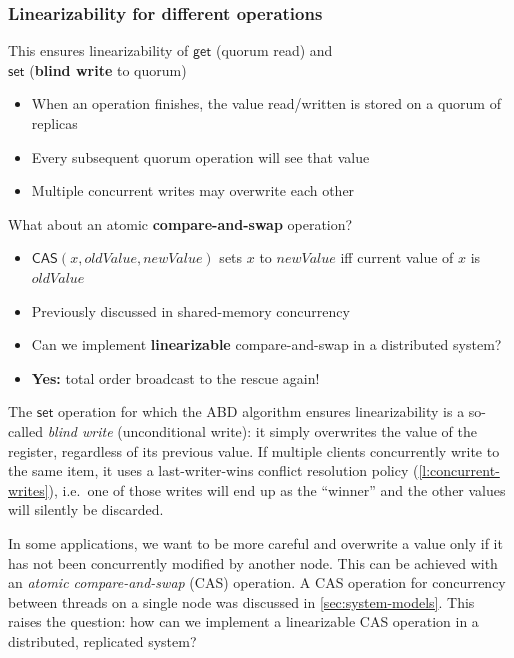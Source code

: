 \begin{frame}
    \label{s:cas-1}
    \frametitle{Linearizability for different operations}
    This ensures linearizability of $\mathsf{get}$ (quorum read) and\\$\mathsf{set}$ (\textbf{blind write} to quorum)\pause
    \begin{itemize}
        \item When an operation finishes, the value read/written is stored on a quorum of replicas
        \item Every subsequent quorum operation will see that value\pause
        \item Multiple concurrent writes may overwrite each other\\[1em]\pause
    \end{itemize}
    What about an atomic \textbf{compare-and-swap} operation?
    \begin{itemize}
        \item $\mathsf{CAS}(x, \mathit{oldValue}, \mathit{newValue})$ sets $x$ to $\mathit{newValue}$
            iff current value of $x$ is $\mathit{oldValue}$
        \item Previously discussed in shared-memory concurrency\pause
        \item Can we implement \textbf{linearizable} compare-and-swap in a distributed system?\pause
        \item \textbf{Yes:} total order broadcast to the rescue again!
    \end{itemize}
\end{frame}
\label{l:cas-1}

The $\mathsf{set}$ operation for which the ABD algorithm ensures linearizability is a so-called \emph{blind write} (unconditional write): it simply overwrites the value of the register, regardless of its previous value.
If multiple clients concurrently write to the same item, it uses a last-writer-wins conflict resolution policy (\autoref{l:concurrent-writes}), i.e.\ one of those writes will end up as the ``winner'' and the other values will silently be discarded.

In some applications, we want to be more careful and overwrite a value only if it has not been concurrently modified by another node.
This can be achieved with an \emph{atomic compare-and-swap} (CAS) operation.
A CAS operation for concurrency between threads on a single node was discussed in \autoref{sec:system-models}.
This raises the question: how can we implement a linearizable CAS operation in a distributed, replicated system?

